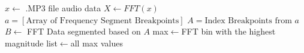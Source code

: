 \documentclass[conference]{IEEEtran}
\begin{document}
\begin{algorithm}
  \caption{Characterizing a Music File}\label{alg:characterize}
  \begin{algorithmic}
    \State $x\gets$ .MP3 file audio data
    \State $X\gets FFT(x)$
    \State $a=[\text{Array of Frequency Segment Breakpoints}]$
    \State $A=\text{Index Breakpoints from }a$
    \State $B\gets$ FFT Data segmented based on $A$
    \State max$\gets$FFT bin with the highest magnitude
    \EndFor
    \State list$\gets$all max values 
    \State {}
    \EndFunction
  \end{algorithmic}
\end{algorithm}
\end{document}
